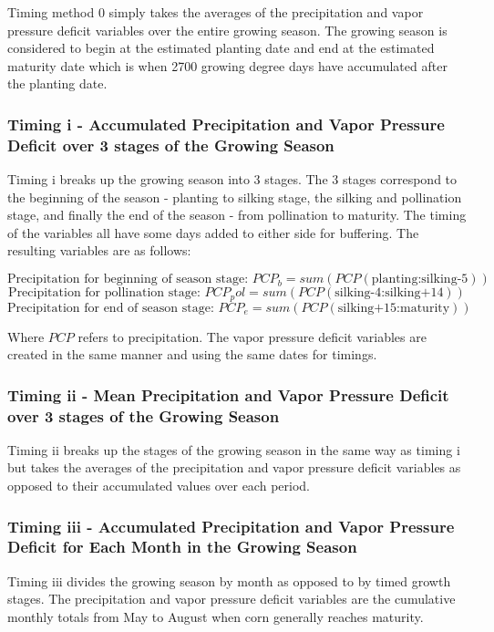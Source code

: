 Timing method 0 simply takes the averages of the precipitation and vapor pressure deficit variables over the entire growing season. The growing season is considered to begin at the estimated planting date and end at the estimated maturity date which is when 2700 growing degree days have accumulated after the planting date.

\subsubsection{Timing i - Accumulated Precipitation and Vapor Pressure Deficit over 3 stages of the Growing Season}

Timing i breaks up the growing season into 3 stages. The 3 stages correspond to the beginning of the season - planting to silking stage, the silking and pollination stage, and finally the end of the season - from pollination to maturity. The timing of the variables all have some days added to either side for buffering. The resulting variables are as follows:

$$\text{Precipitation for beginning of season stage: }PCP_b=sum(PCP(\text{planting:silking-5}))$$
$$\text{Precipitation for pollination stage: }PCP_pol=sum(PCP(\text{silking-4:silking+14}))$$
$$\text{Precipitation for end of season stage: }PCP_e=sum(PCP(\text{silking+15:maturity}))$$

Where $PCP$ refers to precipitation. The vapor pressure deficit variables are created in the same manner and using the same dates for timings. 

\subsubsection{Timing ii - Mean Precipitation and Vapor Pressure Deficit over 3 stages of the Growing Season}

Timing ii breaks up the stages of the growing season in the same way as timing i but takes the averages of the precipitation and vapor pressure deficit variables as opposed to their accumulated values over each period.

\subsubsection{Timing iii -  Accumulated Precipitation and Vapor Pressure Deficit for Each Month in the Growing Season}

Timing iii divides the growing season by month as opposed to by timed growth stages. The precipitation and vapor pressure deficit variables are the cumulative monthly totals from May to August when corn generally reaches maturity.

